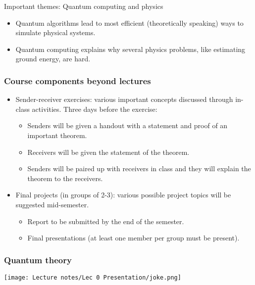 \documentclass{beamer}
\theoremstyle{mystyle}
\newcommand {\beit}{\begin{itemize}}
\newcommand {\enit}{\end{itemize}}
\newcommand{\frmt}[1]{\frametitle{#1}}
\begin{document}
\begin{frame}{Important themes: Quantum computing and physics}

\begin{itemize}
    \item Quantum algorithms lead to most efficient (theoretically speaking) ways to simulate physical systems.
\end{itemize}



\pause

\begin{itemize}
    \item Quantum computing explains why several physics problems, like estimating ground energy, are hard.
\end{itemize}
    
\end{frame}

\begin{frame}
\frmt{Course components beyond lectures}
\beit
\item Sender-receiver exercises: various important concepts discussed through in-class activities. Three days before the exercise:
\pause
\beit
\item Senders will be given a handout with a statement and proof of an important theorem.
\item Receivers will be given the statement of the theorem.
\item Senders will be paired up with receivers in class and they will explain the theorem to the receivers. 
\enit
\pause
\item Final projects (in groups of 2-3): various possible project topics will be suggested mid-semester.  
\beit
\item Report to be submitted by the end of the semester. 
\item Final presentations (at least one member per group must be present).
\enit
\enit
\end{frame}


\begin{frame}
\frmt{Quantum theory}
\centering
\texttt{[image: Lecture notes/Lec 0 Presentation/joke.png]}
\end{frame}
\end{document}
